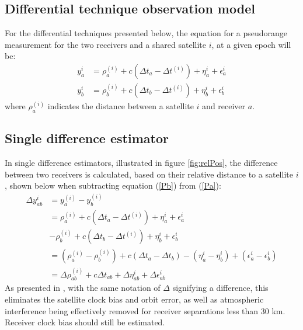 \subsection{Differential technique observation model}\label{diffObsModel}
For the differential techniques presented below, the equation for a pseudorange measurement for the two receivers and a shared satellite $i$, at a given epoch will be:
\begin{align}
y^i_a&=\rho^{(i)}_a+c(\Delta t_a-\Delta t^{(i)})+\eta^i_a+\epsilon^i_a \label{Pa}\\
y^i_b&=\rho^{(i)}_b+c(\Delta t_b -\Delta t^{(i)})+\eta^i_b+\epsilon^i_b\label{Pb}
\end{align}
where $\rho^{(i)}_a$ indicates the distance between a satellite $i$ and receiver $a$.
\subsection{Single difference estimator}\label{singleDifference}
In single difference estimators, illustrated in figure \ref{fig:relPos}, the difference between two receivers is calculated, based on their relative distance to a satellite $i$, shown below when subtracting equation (\ref{Pb}) from (\ref{Pa}):
\begin{align*}
\Delta y^i_{ab}&=y^{(i)}_a-y^{(i)}_b\\
 		&=\rho^{(i)}_a+c(\Delta t_a-\Delta t^{(i)})+\eta^i_a+\epsilon^i_a\\
 		&-\rho^{(i)}_b+c(\Delta t_b -\Delta t^{(i)})+\eta^i_b+\epsilon^i_b\\
		&=(\rho^{(i)}_a-\rho^{(i)}_b)+c(\Delta t_a-\Delta t_b)-(\eta^i_a-\eta^i_b)+(\epsilon^i_a-\epsilon^i_b)\\
		&=\Delta \rho^{(i)}_{ab}+c\Delta t_{ab}+\Delta \eta^i_{ab}+\Delta \epsilon^i_{ab}
\end{align*}
As presented in \cite{blewitt1997basics}, with the same notation of $\Delta$ signifying a difference, this eliminates the satellite clock bias and orbit error, as well as atmospheric interference being effectively removed for receiver separations less than 30 km. Receiver clock bias should still be estimated.

